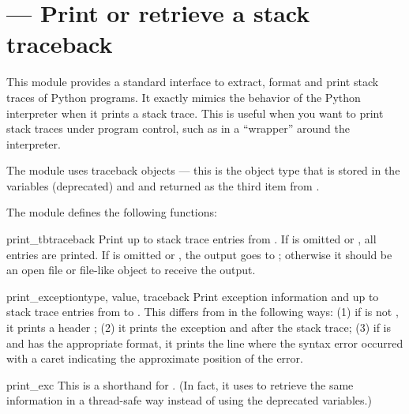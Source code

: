 \section{ ---
         Print or retrieve a stack traceback}



This module provides a standard interface to extract, format and print
stack traces of Python programs.  It exactly mimics the behavior of
the Python interpreter when it prints a stack trace.  This is useful
when you want to print stack traces under program control, such as in a
``wrapper'' around the interpreter.

The module uses traceback objects --- this is the object type that is
stored in the variables  (deprecated) and
 and returned as the third item from
.

The module defines the following functions:

\begin{funcdesc}{print_tb}{traceback}
Print up to  stack trace entries from .  If
 is omitted or , all entries are printed.
If  is omitted or , the output goes to
; otherwise it should be an open file or file-like
object to receive the output.
\end{funcdesc}

\begin{funcdesc}{print_exception}{type, value, traceback}
Print exception information and up to  stack trace entries
from  to .
This differs from  in the
following ways: (1) if  is not , it prints a
header ; (2) it prints the
exception  and  after the stack trace; (3) if
 is  and  has the
appropriate format, it prints the line where the syntax error occurred
with a caret indicating the approximate position of the error.
\end{funcdesc}

\begin{funcdesc}{print_exc}{}
This is a shorthand for .  (In
fact, it uses  to retrieve the same
information in a thread-safe way instead of using the deprecated
variables.)
\end{funcdesc}


